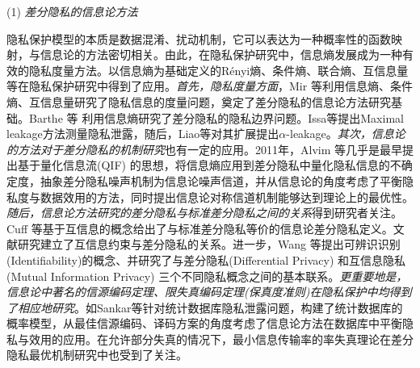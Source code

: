 (1) {\em 差分隐私的信息论方法}\label{subsec:information_dp}

隐私保护模型的本质是数据混淆、扰动机制，它可以表达为一种概率性的函数映射，与信息论的方法密切相关\cite{Duchi2019information}。由此，在隐私保护研究中，信息熵发展成为一种有效的隐私度量方法\cite{issa2016an,Chatzikokolakis2008Anonymity}。以信息熵为基础定义的R\'{e}nyi熵\cite{renyi1961on,erven2014renyi,mironov2017renyi}、条件熵、联合熵、互信息量等在隐私保护研究中得到了应用\cite{wang2019consistent,mcgregor2010the,du2015Fundamental,lopuhaa-zwakenberg2019information}。{\em 首先，隐私度量方面}，Mir 等\cite{mir2012information}利用信息熵、条件熵、互信息量研究了隐私信息的度量问题，奠定了差分隐私的信息论方法研究基础。Barthe 等\cite{barthe2011information} 利用信息熵研究了差分隐私的隐私边界问题。Issa等\cite{issa2016an,2016Maximal}提出Maximal leakage方法测量隐私泄露，随后，Liao等\cite{liao2019tunable}对其扩展提出$\alpha$-leakage。{\em 其次，信息论的方法对于差分隐私的机制研究}也有一定的应用\cite{diaz2020on,kairouz2016extremal,wang2016on}。2011年，Alvim 等\cite{alvim2011differential,alvim2011on,alvim2015on}几乎是最早提出基于量化信息流(QIF) 的思想，将信息熵应用到差分隐私中量化隐私信息的不确定度，抽象差分隐私噪声机制为信息论噪声信道，并从信息论的角度考虑了平衡隐私度与数据效用的方法，同时提出信息论对称信道机制能够达到理论上的最优性。{\em 随后，信息论方法研究的差分隐私与标准差分隐私之间的关系}得到研究者关注\cite{mcgregor2010the}。Cuff 等\cite{cuff2016differential}基于互信息的概念给出了与标准差分隐私等价的信息论差分隐私定义。文献研究建立了互信息约束与差分隐私的关系。进一步，Wang 等\cite{wang2016on}提出可辨识识别(Identifiability)的概念、并研究了与差分隐私(Differential Privacy) 和互信息隐私(Mutual Information Privacy) 三个不同隐私概念之间的基本联系。{\em 更重要地是，信息论中著名的信源编码定理、限失真编码定理(保真度准则)}\cite{cover2006elements}{\em 在隐私保护中均得到了相应地研究}\cite{rebollo-monedero2010from,du2015Fundamental}。如Sankar等\cite{sankar2013utility}针对统计数据库隐私泄露问题，构建了统计数据库的概率模型，从最佳信源编码、译码方案的角度考虑了信息论方法在数据库中平衡隐私与效用的应用。在允许部分失真的情况下，最小信息传输率的率失真理论在差分隐私\cite{mir2012information,wang2016on}最优机制研究中也受到了关注。

